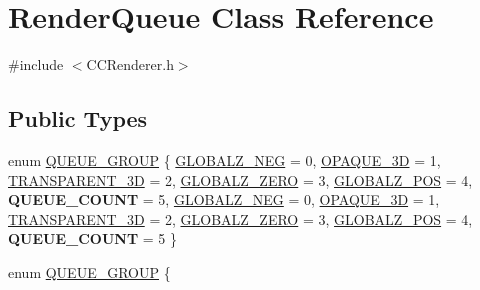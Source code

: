 \hypertarget{classRenderQueue}{}\section{Render\+Queue Class Reference}
\label{classRenderQueue}


{\ttfamily \#include $<$C\+C\+Renderer.\+h$>$}

\subsection*{Public Types}
\begin{DoxyCompactItemize}
\item 
enum \hyperlink{classRenderQueue_a546a6ca0aa906f2fd8f86c698c76854e}{Q\+U\+E\+U\+E\+\_\+\+G\+R\+O\+UP} \{ \newline
\hyperlink{classRenderQueue_a546a6ca0aa906f2fd8f86c698c76854ea007a71d4a36a76a8cf3245f860940719}{G\+L\+O\+B\+A\+L\+Z\+\_\+\+N\+EG} = 0, 
\hyperlink{classRenderQueue_a546a6ca0aa906f2fd8f86c698c76854eab547d49374a5df7ced88f03810c2fed6}{O\+P\+A\+Q\+U\+E\+\_\+3D} = 1, 
\hyperlink{classRenderQueue_a546a6ca0aa906f2fd8f86c698c76854ea6613186e6bd47285eb20933cdefe0d00}{T\+R\+A\+N\+S\+P\+A\+R\+E\+N\+T\+\_\+3D} = 2, 
\hyperlink{classRenderQueue_a546a6ca0aa906f2fd8f86c698c76854ea2324a4a46acd2ff3cda968d33a389c69}{G\+L\+O\+B\+A\+L\+Z\+\_\+\+Z\+E\+RO} = 3, 
\newline
\hyperlink{classRenderQueue_a546a6ca0aa906f2fd8f86c698c76854ea32525bc27584cb81b709016333a2b56f}{G\+L\+O\+B\+A\+L\+Z\+\_\+\+P\+OS} = 4, 
{\bfseries Q\+U\+E\+U\+E\+\_\+\+C\+O\+U\+NT} = 5, 
\hyperlink{classRenderQueue_a546a6ca0aa906f2fd8f86c698c76854ea007a71d4a36a76a8cf3245f860940719}{G\+L\+O\+B\+A\+L\+Z\+\_\+\+N\+EG} = 0, 
\hyperlink{classRenderQueue_a546a6ca0aa906f2fd8f86c698c76854eab547d49374a5df7ced88f03810c2fed6}{O\+P\+A\+Q\+U\+E\+\_\+3D} = 1, 
\newline
\hyperlink{classRenderQueue_a546a6ca0aa906f2fd8f86c698c76854ea6613186e6bd47285eb20933cdefe0d00}{T\+R\+A\+N\+S\+P\+A\+R\+E\+N\+T\+\_\+3D} = 2, 
\hyperlink{classRenderQueue_a546a6ca0aa906f2fd8f86c698c76854ea2324a4a46acd2ff3cda968d33a389c69}{G\+L\+O\+B\+A\+L\+Z\+\_\+\+Z\+E\+RO} = 3, 
\hyperlink{classRenderQueue_a546a6ca0aa906f2fd8f86c698c76854ea32525bc27584cb81b709016333a2b56f}{G\+L\+O\+B\+A\+L\+Z\+\_\+\+P\+OS} = 4, 
{\bfseries Q\+U\+E\+U\+E\+\_\+\+C\+O\+U\+NT} = 5
 \}
\item 
enum \hyperlink{classRenderQueue_a546a6ca0aa906f2fd8f86c698c76854e}{Q\+U\+E\+U\+E\+\_\+\+G\+R\+O\+UP} \{ \newline

\end{DoxyCompactItemize}
